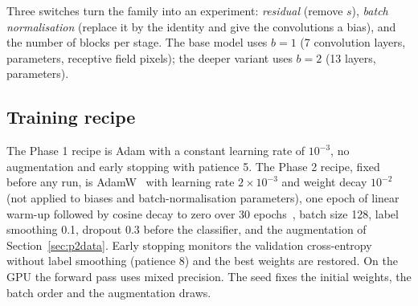 Three switches turn the family into an experiment: \emph{residual} (remove $s$), \emph{batch normalisation}
(replace it by the identity and give the convolutions a bias), and the number of blocks per stage. The base model
uses $b=1$ (7 convolution layers, \ParamsBase{} parameters, receptive field \RFBase{} pixels); the deeper variant
uses $b=2$ (13 layers, \ParamsDeeper{} parameters).



\subsection{Training recipe}
The Phase 1 recipe is Adam with a constant learning rate of $10^{-3}$, no augmentation and early stopping with
patience 5. The Phase 2 recipe, fixed before any run, is AdamW~\cite{loshchilov2019decoupled} with learning rate
$2\times10^{-3}$ and weight decay $10^{-2}$ (not applied to biases and batch-normalisation parameters), one epoch
of linear warm-up followed by cosine decay to zero over 30 epochs~\cite{loshchilov2017sgdr}, batch size 128, label
smoothing 0.1, dropout 0.3 before the classifier, and the augmentation of Section~\ref{sec:p2data}. Early stopping
monitors the validation cross-entropy without label smoothing (patience 8) and the best weights are restored. On
the GPU the forward pass uses mixed precision. The seed fixes the initial weights, the batch order and the
augmentation draws.
